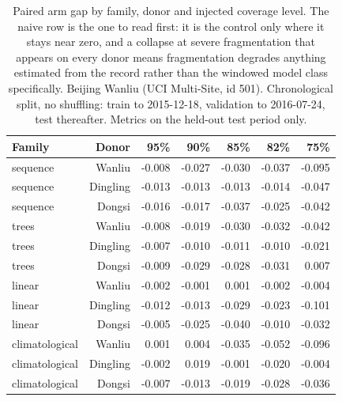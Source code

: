 \begin{table}[htbp]
\caption{Paired arm gap by family, donor and injected coverage level. The naive row is the one to read first: it is the control only where it stays near zero, and a collapse at severe fragmentation that appears on every donor means fragmentation degrades anything estimated from the record rather than the windowed model class specifically. Beijing Wanliu (UCI Multi-Site, id 501). Chronological split, no shuffling: train to 2015-12-18, validation to 2016-07-24, test thereafter. Metrics on the held-out test period only.}
\label{tab:donor_replication_by_level}
\begin{tabular}{lrrrrrr}
\toprule
Family & Donor & 95\% & 90\% & 85\% & 82\% & 75\% \\
\midrule
sequence & Wanliu & -0.008 & -0.027 & -0.030 & -0.037 & -0.095 \\
sequence & Dingling & -0.013 & -0.013 & -0.013 & -0.014 & -0.047 \\
sequence & Dongsi & -0.016 & -0.017 & -0.037 & -0.025 & -0.042 \\
trees & Wanliu & -0.008 & -0.019 & -0.030 & -0.032 & -0.042 \\
trees & Dingling & -0.007 & -0.010 & -0.011 & -0.010 & -0.021 \\
trees & Dongsi & -0.009 & -0.029 & -0.028 & -0.031 & 0.007 \\
linear & Wanliu & -0.002 & -0.001 & 0.001 & -0.002 & -0.004 \\
linear & Dingling & -0.012 & -0.013 & -0.029 & -0.023 & -0.101 \\
linear & Dongsi & -0.005 & -0.025 & -0.040 & -0.010 & -0.032 \\
climatological & Wanliu & 0.001 & 0.004 & -0.035 & -0.052 & -0.096 \\
climatological & Dingling & -0.002 & 0.019 & -0.001 & -0.020 & -0.004 \\
climatological & Dongsi & -0.007 & -0.013 & -0.019 & -0.028 & -0.036 \\
\bottomrule
\end{tabular}
\end{table}
